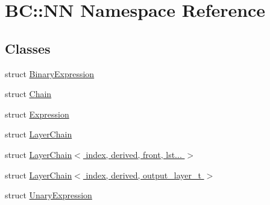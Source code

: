 \hypertarget{namespaceBC_1_1NN}{}\section{BC\+:\+:NN Namespace Reference}
\label{namespaceBC_1_1NN}
\subsection*{Classes}
\begin{DoxyCompactItemize}
\item 
struct \hyperlink{structBC_1_1NN_1_1BinaryExpression}{Binary\+Expression}
\item 
struct \hyperlink{structBC_1_1NN_1_1Chain}{Chain}
\item 
struct \hyperlink{structBC_1_1NN_1_1Expression}{Expression}
\item 
struct \hyperlink{structBC_1_1NN_1_1LayerChain}{Layer\+Chain}
\item 
struct \hyperlink{structBC_1_1NN_1_1LayerChain_3_01index_00_01derived_00_01front_00_01lst_8_8_8_01_4}{Layer\+Chain$<$ index, derived, front, lst... $>$}
\item 
struct \hyperlink{structBC_1_1NN_1_1LayerChain_3_01index_00_01derived_00_01output__layer__t_01_4}{Layer\+Chain$<$ index, derived, output\+\_\+layer\+\_\+t $>$}
\item 
struct \hyperlink{structBC_1_1NN_1_1UnaryExpression}{Unary\+Expression}
\end{DoxyCompactItemize}
